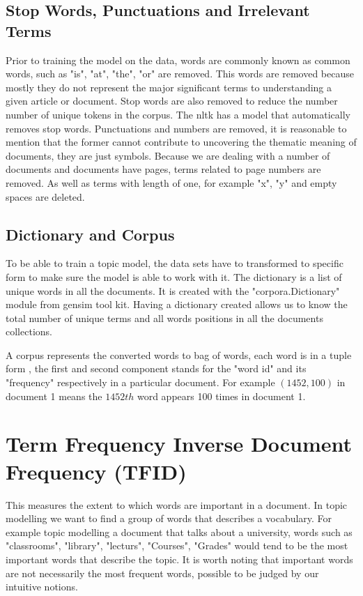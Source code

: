 \subsection{Stop Words, Punctuations  and Irrelevant Terms}
\begin{flushleft}
Prior to training the model on the data, words are commonly known as common words, such as "is", "at", "the", "or" are removed. This words are removed because mostly they do not represent the major significant terms to understanding a given article or document. Stop words are also removed to reduce the number number of unique tokens in the corpus. The nltk has a model that automatically removes stop words. Punctuations and numbers are removed, it is reasonable to mention that the former cannot contribute to uncovering the  thematic meaning of documents, they are just symbols. Because we are dealing with a number of documents and documents have pages, terms related to page numbers are removed. As well as terms with  length of one, for example "x", "y" and empty spaces are deleted. 

\end{flushleft}
\subsection{Dictionary and Corpus}
\begin{flushleft}
To be able to train a topic model, the data sets have to transformed to specific form to make sure the model is able to work with it. The dictionary is a list of unique words in all the documents. It is created with the "corpora.Dictionary" module from gensim tool kit. Having a dictionary created allows us to know the total number of unique terms and all words positions in all the documents collections.
\end{flushleft}
A corpus represents the converted words to bag of words, each word is in a tuple form , the first and second component stands for the  "word id" and its  "frequency" respectively in a particular document. For example $(1452,100)$ in document 1 means the $1452th$ word appears 100 times in document 1.
\section{Term Frequency Inverse Document Frequency (TFID)}
\begin{flushleft}
This measures the extent to which words are important in a document. In topic modelling we want to find a group of words that describes a vocabulary. For example topic modelling a document that talks about a university, words such as "classrooms", "library", "lecturs", "Courses", "Grades" would tend to be the most important words that describe the topic. It is worth noting that important words are not necessarily the most frequent words, possible to be judged by our intuitive notions. 
\end{flushleft}

